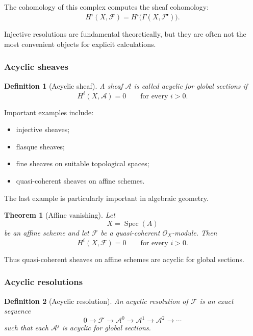 \documentclass[12pt,a4paper]{article}
\newtheorem{theorem}{Theorem}[section]
\theoremstyle{notespace}
\newtheorem{definition}{Definition}[subsection]
\begin{document}
The cohomology of this complex computes the sheaf cohomology:
\[
H^{i}(X,\mathcal{F})
=
H^{i}\bigl(\Gamma(X,\mathcal{I}^{\bullet})\bigr).
\]

Injective resolutions are fundamental theoretically, but they are often not
the most convenient objects for explicit calculations.

\subsubsection{Acyclic sheaves}

\begin{definition}[Acyclic sheaf]
	A sheaf \(\mathcal{A}\) is called \emph{acyclic for global sections} if
	\[
	H^{i}(X,\mathcal{A})=0
	\qquad
	\text{for every } i>0.
	\]
\end{definition}

Important examples include:
\begin{itemize}
	\item injective sheaves;
	\item flasque sheaves;
	\item fine sheaves on suitable topological spaces;
	\item quasi-coherent sheaves on affine schemes.
\end{itemize}

The last example is particularly important in algebraic geometry.

\begin{theorem}[Affine vanishing]
	Let
	\[
	X=\operatorname{Spec}(A)
	\]
	be an affine scheme and let \(\mathcal{F}\) be a quasi-coherent
	\(\mathcal{O}_{X}\)-module. Then
	\[
	H^{i}(X,\mathcal{F})=0
	\qquad
	\text{for every } i>0.
	\]
\end{theorem}

Thus quasi-coherent sheaves on affine schemes are acyclic for global
sections.

\subsubsection{Acyclic resolutions}

\begin{definition}[Acyclic resolution]
	An \emph{acyclic resolution} of \(\mathcal{F}\) is an exact sequence
	\[
	0
	\longrightarrow
	\mathcal{F}
	\longrightarrow
	\mathcal{A}^{0}
	\longrightarrow
	\mathcal{A}^{1}
	\longrightarrow
	\mathcal{A}^{2}
	\longrightarrow
	\cdots
	\]
	such that each \(\mathcal{A}^{j}\) is acyclic for global sections.
\end{definition}
\end{document}
